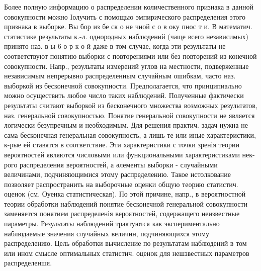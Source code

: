 \documentclass[10pt]{article}
\begin{document}
Более полную информацию о распределении количественного признака в данной совокупности можно Іолучить с помощью эмпирического распределения этого признака в выборке. Вы бор из бе ск о не чной с о в оку пнос т и. В математич. статистике результаты к.-л. однородных наблюдений (чаще всего независимых) принято наз. в ы 6 о р к о й даже в том случае, когда эти результаты не соответствуют понятию выборки с повторениями или без повторений из конечной совокупности. Напр., результаты измерений углов на местности, подверженные независимым непрерывно распределенным случайным ошибкам, часто наз. выборкой из бесконечной совокупности. Предполагается, что принципиально можно осуществить любое число таких наблюдений. Полученные фактически результаты считают выборкой из бесконечного множества возможных результатов, наз. генеральной совокупностью. Понятие генеральной совокупности не является логически безупречным и необходимым. Для решения практич. задач нужна не сама бесконечная генеральная совокупность, а лишь те или иные характеристики, к-рые ей ставятся в соответствие. Эти характеристики с точки зренія теории вероятностей являются числовыми или функциональными характеристиками нек-рого распределения вероятностей, а әлементы выборки - случайными величинами, подчиняющимися этому распределению. Такое истолкование позволяет распространить на выборочные оценки общую теорию статистич. оценок (см. Оуенка статистическая). По этой причине, напр., в вероятностной теории обработки наблюдений понятие бесконечной генеральной совокупности заменяется понятием распределенія вероятностей, содержащего неизвестные параметры. Результаты наблюдений трактуются как экспериментально наблюдаемые значения случайных величин, подчиняющихся этому распределению. Цель обработки вычисление по результатам наблюдений в том или ином смысле оптимальных статистич. оценок для нешзвестных параметров распределеншя.
\end{document}
